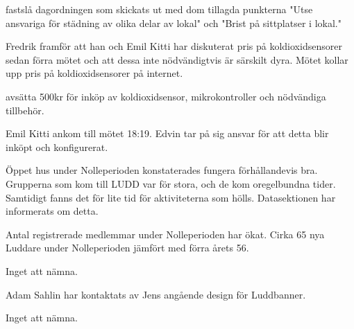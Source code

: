 \documentclass{protokoll}
\begin{document}
\newpage  


\begin{beslut}
     \att fastslå dagordningen som skickats ut med dom tillagda punkterna "Utse ansvariga för städning av olika delar av lokal" och "Brist på sittplatser i lokal."
\end{beslut}

Fredrik framför att han och Emil Kitti har diskuterat pris på koldioxidsensorer sedan förra mötet och att dessa inte nödvändigtvis är särskilt dyra. 
Mötet kollar upp pris på koldioxidsensorer på internet.
\begin{beslut}
    \att avsätta 500kr för inköp av koldioxidsensor, mikrokontroller och nödvändiga tillbehör.
\end{beslut}
Emil Kitti ankom till mötet 18:19.
Edvin tar på sig ansvar för att detta blir inköpt och konfigurerat. 

Öppet hus under Nolleperioden konstaterades fungera förhållandevis bra. Grupperna som kom till LUDD var för stora, och de kom oregelbundna tider. Samtidigt fanns det för lite tid för aktiviteterna som hölls. Datasektionen har informerats om detta.

Antal registrerade medlemmar under Nolleperioden har ökat. Cirka 65 nya Luddare under Nolleperioden jämfört med förra årets 56.

Inget att nämna.

Adam Sahlin har kontaktats av Jens angående design för Luddbanner.

Inget att nämna. 
\end{document}
